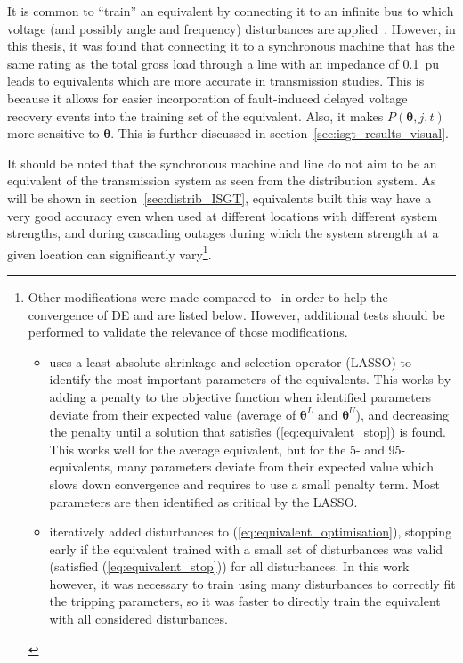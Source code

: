 

It is common to ``train'' an equivalent by connecting it to an infinite bus to which voltage (and possibly angle and frequency) disturbances are applied~\cite{ChaspierreThesis, CIGREloadModels, fulgencio}. However, in this thesis, it was found that connecting it to a synchronous machine that has the same rating as the total gross load through a line with an impedance of 0.1~pu leads to equivalents which are more accurate in transmission studies. This is because it allows for easier incorporation of fault-induced delayed voltage recovery events into the training set of the equivalent. Also, it makes \(P(\bm{\theta}, j, t)\) more sensitive to \(\bm{\theta}\). This is further discussed in section~\ref{sec:isgt_results_visual}.

It should be noted that the synchronous machine and line do not aim to be an equivalent of the transmission system as seen from the distribution system. As will be shown in section~\ref{sec:distrib_ISGT}, equivalents built this way have a very good accuracy even when used at different locations with different system strengths, and during cascading outages during which the system strength at a given location can significantly vary\footnote{Other modifications were made compared to~\cite{ChaspierreThesis} in order to help the convergence of DE and are listed below. However, additional tests should be performed to validate the relevance of those modifications.
\begin{itemize}
    \item \cite{ChaspierreThesis} uses a least absolute shrinkage and selection operator (LASSO) to identify the most important parameters of the equivalents. This works by adding a penalty to the objective function when identified parameters deviate from their expected value (average of \(\bm{\theta}^L\) and \(\bm{\theta}^U\)), and decreasing the penalty until a solution that satisfies (\ref{eq:equivalent_stop}) is found. This works well for the average equivalent, but for the 5- and 95-equivalents, many parameters deviate from their expected value which slows down convergence and requires to use a small penalty term. Most parameters are then identified as critical by the LASSO.
    \item \cite{ChaspierreThesis} iteratively added disturbances to (\ref{eq:equivalent_optimisation}), stopping early if the equivalent trained with a small set of disturbances was valid (\ie satisfied (\ref{eq:equivalent_stop})) for all disturbances. In this work however, it was necessary to train using many disturbances to correctly fit the tripping parameters, so it was faster to directly train the equivalent with all considered disturbances.
\end{itemize}
}.



